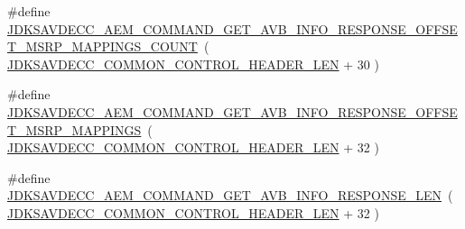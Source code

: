 \begin{DoxyCompactItemize}
\item 
\#define \hyperlink{group__command__get__avb__info__response_ga2d321732f9b7fcb14f7476c828898f02}{J\+D\+K\+S\+A\+V\+D\+E\+C\+C\+\_\+\+A\+E\+M\+\_\+\+C\+O\+M\+M\+A\+N\+D\+\_\+\+G\+E\+T\+\_\+\+A\+V\+B\+\_\+\+I\+N\+F\+O\+\_\+\+R\+E\+S\+P\+O\+N\+S\+E\+\_\+\+O\+F\+F\+S\+E\+T\+\_\+\+M\+S\+R\+P\+\_\+\+M\+A\+P\+P\+I\+N\+G\+S\+\_\+\+C\+O\+U\+NT}~( \hyperlink{group__jdksavdecc__avtp__common__control__header_gaae84052886fb1bb42f3bc5f85b741dff}{J\+D\+K\+S\+A\+V\+D\+E\+C\+C\+\_\+\+C\+O\+M\+M\+O\+N\+\_\+\+C\+O\+N\+T\+R\+O\+L\+\_\+\+H\+E\+A\+D\+E\+R\+\_\+\+L\+EN} + 30 )
\item 
\#define \hyperlink{group__command__get__avb__info__response_gab4df997b6dd903476dba2c93e68d1388}{J\+D\+K\+S\+A\+V\+D\+E\+C\+C\+\_\+\+A\+E\+M\+\_\+\+C\+O\+M\+M\+A\+N\+D\+\_\+\+G\+E\+T\+\_\+\+A\+V\+B\+\_\+\+I\+N\+F\+O\+\_\+\+R\+E\+S\+P\+O\+N\+S\+E\+\_\+\+O\+F\+F\+S\+E\+T\+\_\+\+M\+S\+R\+P\+\_\+\+M\+A\+P\+P\+I\+N\+GS}~( \hyperlink{group__jdksavdecc__avtp__common__control__header_gaae84052886fb1bb42f3bc5f85b741dff}{J\+D\+K\+S\+A\+V\+D\+E\+C\+C\+\_\+\+C\+O\+M\+M\+O\+N\+\_\+\+C\+O\+N\+T\+R\+O\+L\+\_\+\+H\+E\+A\+D\+E\+R\+\_\+\+L\+EN} + 32 )
\item 
\#define \hyperlink{group__command__get__avb__info__response_gaf41c75a91000da409b3e8c964ab192f4}{J\+D\+K\+S\+A\+V\+D\+E\+C\+C\+\_\+\+A\+E\+M\+\_\+\+C\+O\+M\+M\+A\+N\+D\+\_\+\+G\+E\+T\+\_\+\+A\+V\+B\+\_\+\+I\+N\+F\+O\+\_\+\+R\+E\+S\+P\+O\+N\+S\+E\+\_\+\+L\+EN}~( \hyperlink{group__jdksavdecc__avtp__common__control__header_gaae84052886fb1bb42f3bc5f85b741dff}{J\+D\+K\+S\+A\+V\+D\+E\+C\+C\+\_\+\+C\+O\+M\+M\+O\+N\+\_\+\+C\+O\+N\+T\+R\+O\+L\+\_\+\+H\+E\+A\+D\+E\+R\+\_\+\+L\+EN} + 32 )
\end{DoxyCompactItemize}
